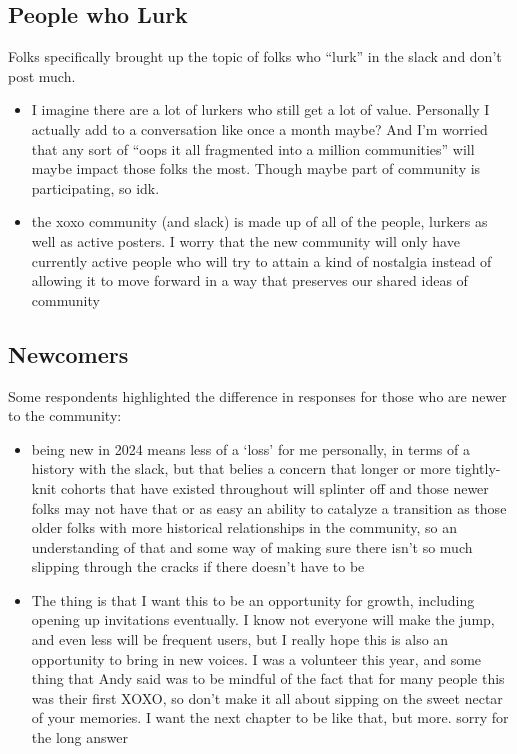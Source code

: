 \documentclass[
]{book}
\providecommand{\tightlist}{%
  \setlength{\itemsep}{0pt}\setlength{\parskip}{0pt}}
\begin{document}
\subsection{People who Lurk}\label{people-who-lurk}

Folks specifically brought up the topic of folks who ``lurk'' in the slack and don't post much.

\begin{itemize}
\tightlist
\item
  I imagine there are a lot of lurkers who still get a lot of value. Personally I actually add to a conversation like once a month maybe? And I'm worried that any sort of ``oops it all fragmented into a million communities'' will maybe impact those folks the most. Though maybe part of community is participating, so idk.
\item
  the xoxo community (and slack) is made up of all of the people, lurkers as well as active posters. I worry that the new community will only have currently active people who will try to attain a kind of nostalgia instead of allowing it to move forward in a way that preserves our shared ideas of community
\end{itemize}

\subsection{Newcomers}\label{newcomers}

Some respondents highlighted the difference in responses for those who are newer to the community:

\begin{itemize}
\tightlist
\item
  being new in 2024 means less of a `loss' for me personally, in terms of a history with the slack, but that belies a concern that longer or more tightly-knit cohorts that have existed throughout will splinter off and those newer folks may not have that or as easy an ability to catalyze a transition as those older folks with more historical relationships in the community, so an understanding of that and some way of making sure there isn't so much slipping through the cracks if there doesn't have to be
\item
  The thing is that I want this to be an opportunity for growth, including opening up invitations eventually. I know not everyone will make the jump, and even less will be frequent users, but I really hope this is also an opportunity to bring in new voices. I was a volunteer this year, and some thing that Andy said was to be mindful of the fact that for many people this was their first XOXO, so don't make it all about sipping on the sweet nectar of your memories. I want the next chapter to be like that, but more. sorry for the long answer
\end{itemize}
\end{document}
